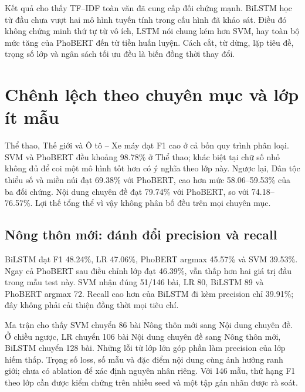Kết quả cho thấy TF--IDF toàn văn đã cung cấp đối chứng mạnh. BiLSTM học từ đầu chưa vượt hai mô hình tuyến tính trong cấu hình đã khảo sát. Điều đó không chứng minh thứ tự từ vô ích, LSTM nói chung kém hơn SVM, hay toàn bộ mức tăng của PhoBERT đến từ tiền huấn luyện. Cách cắt, từ dừng, lặp tiêu đề, trọng số lớp và ngân sách tối ưu đều là biến đồng thời thay đổi.

\section{Chênh lệch theo chuyên mục và lớp ít mẫu}
Thể thao, Thế giới và Ô tô -- Xe máy đạt F1 cao ở cả bốn quy trình phân loại. SVM và PhoBERT đều khoảng 98.78\% ở Thể thao; khác biệt tại chữ số nhỏ không đủ để coi một mô hình tốt hơn có ý nghĩa theo lớp này. Ngược lại, Dân tộc thiểu số và miền núi đạt 69.38\% với PhoBERT, cao hơn mức 58.06--59.53\% của ba đối chứng. Nội dung chuyên đề đạt 79.74\% với PhoBERT, so với 74.18--76.57\%. Lợi thế tổng thể vì vậy không phân bố đều trên mọi chuyên mục.

\subsection{Nông thôn mới: đánh đổi precision và recall}
BiLSTM đạt F1 48.24\%, LR 47.06\%, PhoBERT argmax 45.57\% và SVM 39.53\%. Ngay cả PhoBERT sau điều chỉnh lớp đạt 46.39\%, vẫn thấp hơn hai giá trị đầu trong mẫu test này. SVM nhận đúng 51/146 bài, LR 80, BiLSTM 89 và PhoBERT argmax 72. Recall cao hơn của BiLSTM đi kèm precision chỉ 39.91\%; đây không phải cải thiện đồng thời mọi tiêu chí.

Ma trận cho thấy SVM chuyển 86 bài Nông thôn mới sang Nội dung chuyên đề. Ở chiều ngược, LR chuyển 106 bài Nội dung chuyên đề sang Nông thôn mới, BiLSTM chuyển 128 bài. Những lỗi từ lớp lớn góp phần làm precision của lớp hiếm thấp. Trọng số loss, số mẫu và đặc điểm nội dung cùng ảnh hưởng ranh giới; chưa có ablation để xác định nguyên nhân riêng. Với 146 mẫu, thứ hạng F1 theo lớp cần được kiểm chứng trên nhiều seed và một tập gán nhãn được rà soát.

